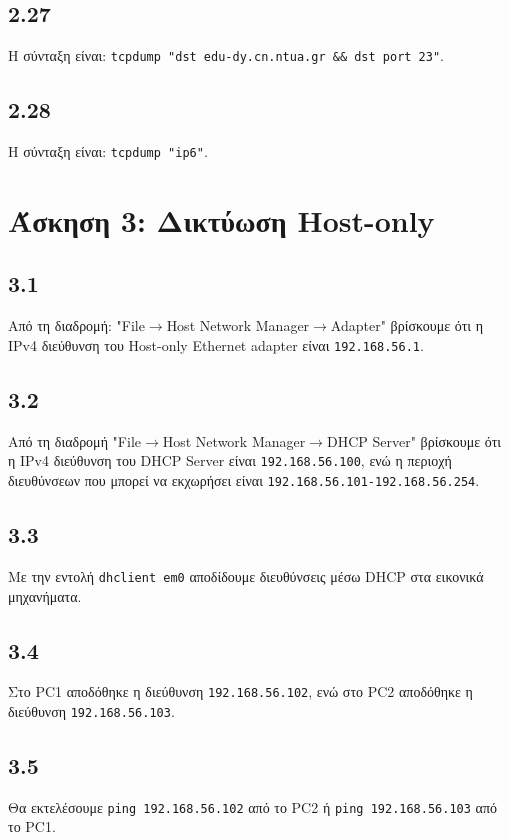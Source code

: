 \documentclass[a4paper, 12pt]{article}
\begin{document}
	\subsection*{2.27}
		Η σύνταξη είναι: \verb|tcpdump "dst edu-dy.cn.ntua.gr && dst port 23"|.
			
	\subsection*{2.28}
		Η σύνταξη είναι: \verb|tcpdump "ip6"|.
			

\section*{Άσκηση 3: Δικτύωση Host-only}

	\subsection*{3.1}
		Από τη διαδρομή: "File$\rightarrow$Host Network Manager$\rightarrow$Adapter" βρίσκουμε ότι η IPv4 διεύθυνση του Host-only Ethernet adapter είναι \verb|192.168.56.1|.

	\subsection*{3.2}
		Από τη διαδρομή "File$\rightarrow$Host Network Manager$\rightarrow$DHCP Server" βρίσκουμε ότι η IPv4 διεύθυνση του DHCP Server είναι \verb|192.168.56.100|, ενώ η περιοχή διευθύνσεων που μπορεί να εκχωρήσει είναι \verb|192.168.56.101-192.168.56.254|.

	\subsection*{3.3}
		Με την εντολή \verb|dhclient em0| αποδίδουμε διευθύνσεις μέσω DHCP στα εικονικά μηχανήματα.  

	\subsection*{3.4}
		Στο PC1 αποδόθηκε η διεύθυνση \verb|192.168.56.102|, ενώ στο PC2 αποδόθηκε η διεύθυνση \verb|192.168.56.103|.

	\subsection*{3.5}
		Θα εκτελέσουμε \verb|ping 192.168.56.102| από το PC2 ή \verb|ping 192.168.56.103| από το PC1. \\
		
\end{document}
